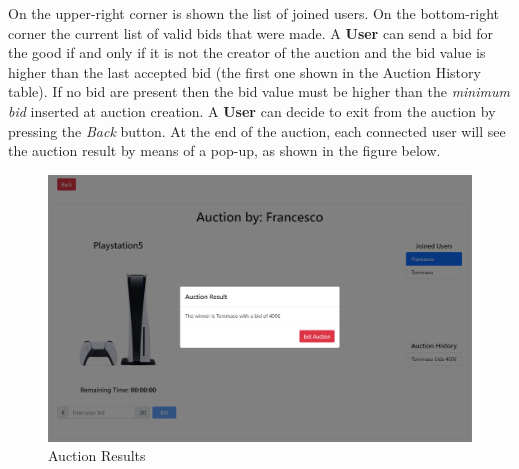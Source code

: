 On the upper-right corner is shown the list of joined users. On the bottom-right corner the current list of valid bids that were made. A \textbf{User} can send a bid for the good if and only if it is not the creator of the auction and the bid value is higher than the last accepted bid (the first one shown in the Auction History table). If no bid are present then the bid value must be higher than the \textit{minimum bid} inserted at auction creation.
A \textbf{User} can decide to exit from the auction by pressing the \textit{Back} button.
At the end of the auction, each connected user will see the auction result by means of a pop-up, as shown in the figure below.

\begin{figure}[H]
	\centering
	\includegraphics[width=1\linewidth]{img/auction_finish}
	\caption{Auction Results}
	\label{fig:auctionfinish}
\end{figure}
